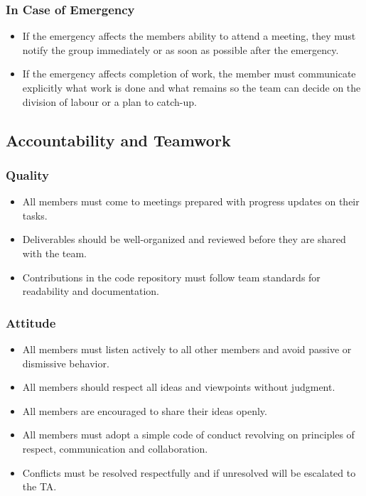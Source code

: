 \documentclass{article}
\begin{document}
\subsubsection*{In Case of Emergency}
\begin{itemize}
    \item If the emergency affects the members ability to attend a meeting, they must notify the group immediately or as soon as possible after the emergency.
    \item If the emergency affects completion of work, the member must communicate explicitly what work is done and what remains so the team can decide on the division of labour or a plan to catch-up.
\end{itemize}


\subsection*{Accountability and Teamwork}

\subsubsection*{Quality} 
\begin{itemize}
    \item All members must come to meetings prepared with progress updates on their tasks.
    \item Deliverables should be well-organized and reviewed before they are shared with the team.
    \item Contributions in the code repository must follow team standards for readability and documentation.
\end{itemize}

\subsubsection*{Attitude}
\begin{itemize}
    \item All members must listen actively to all other members and avoid passive or dismissive behavior.
    \item All members should respect all ideas and viewpoints without judgment.
    \item All members are encouraged to share their ideas openly.
    \item All members must adopt a simple code of conduct revolving on principles of respect, communication and collaboration.
    \item Conflicts must be resolved respectfully and if unresolved will be escalated to the TA.
\end{itemize}
\end{document}
